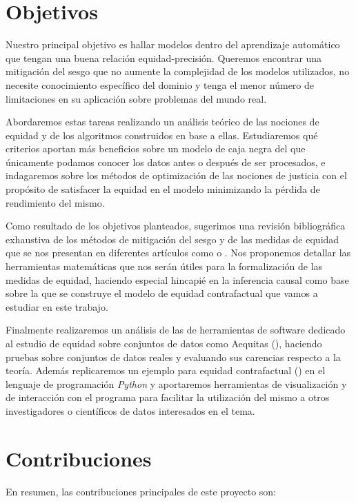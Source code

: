 \documentclass[oneside,openright,titlepage,numbers=noenddot,openany,headinclude,footinclude=true,
cleardoublepage=empty,abstractoff,BCOR=5mm,paper=a4,fontsize=12pt,main=spanish]{scrreprt}
\begin{document}
\section{Objetivos}

Nuestro principal objetivo es hallar modelos dentro del aprendizaje automático que tengan una buena relación equidad-precisión. Queremos encontrar una mitigación del sesgo que no aumente la complejidad de los modelos utilizados, no necesite conocimiento específico del dominio y tenga el menor número de limitaciones en su aplicación sobre problemas del mundo real.

Abordaremos estas tareas realizando un análisis teórico de las nociones de equidad y de los algoritmos construidos en base a ellas. Estudiaremos qué criterios aportan más beneficios sobre un modelo de caja negra del que únicamente podamos conocer los datos antes o después de ser procesados, e indagaremos sobre los métodos de optimización de las nociones de justicia con el propósito de satisfacer la equidad en el modelo minimizando la pérdida de rendimiento del mismo.

Como resultado de los objetivos planteados, sugerimos una revisión bibliográfica exhaustiva
de los métodos de mitigación del sesgo y de las medidas de equidad que se nos presentan en diferentes artículos como \cite{formalizing2018} o \cite{definitions2018}. Nos proponemos detallar las herramientas matemáticas que nos serán útiles para la formalización de las medidas de equidad, haciendo especial hincapié en la inferencia causal como base sobre la que se construye el modelo de equidad contrafactual que vamos a estudiar en este trabajo.

Finalmente realizaremos un análisis de las de herramientas de software dedicado al estudio de equidad sobre conjuntos de datos como Aequitas (\cite{aequitas2019}), haciendo pruebas sobre conjuntos de datos reales y evaluando sus carencias respecto a la teoría. Además replicaremos un ejemplo para equidad contrafactual (\cite{counterfactual2018}) en el lenguaje de programación \textit{Python} y aportaremos herramientas de visualización y de interacción con el programa para facilitar la utilización del mismo a otros investigadores o científicos de datos interesados en el tema.

\section{Contribuciones}

En resumen, las contribuciones principales de este proyecto son:
\end{document}
